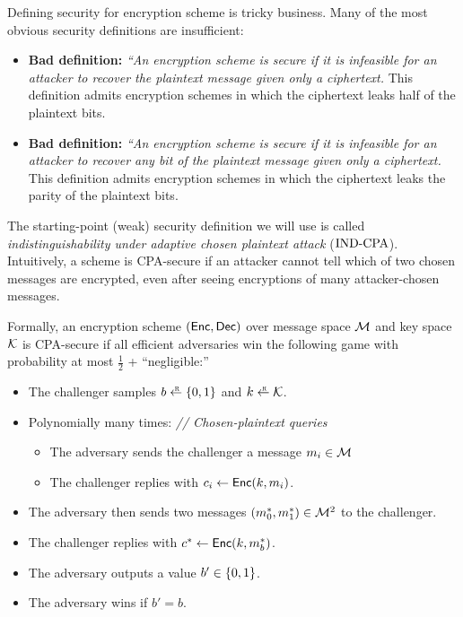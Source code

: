 Defining security for encryption scheme is tricky business.
Many of the most obvious security definitions are insufficient:
\begin{itemize}
  \item \textbf{Bad definition:} \emph{``An encryption scheme is secure 
        if it is infeasible for an attacker to recover the plaintext
        message given only a ciphertext.}
        This definition admits encryption schemes in which the ciphertext
        leaks half of the plaintext bits.
  \item \textbf{Bad definition:} \emph{``An encryption scheme is secure 
        if it is infeasible for an attacker to recover any bit of
        the plaintext message given only a ciphertext.}
        This definition admits encryption schemes in which the ciphertext
        leaks the parity of the plaintext bits.
\end{itemize}

The starting-point (weak) security definition we will use
is called \emph{indistinguishability under adaptive chosen plaintext attack}
($\text{IND-CPA}$).
Intuitively, a scheme is CPA-secure if an attacker cannot tell which of two chosen messages are encrypted, even after seeing encryptions of many attacker-chosen messages.

\begin{definition}\label{defn:cpa}
Formally, an encryption scheme $(\mathsf{Enc}, \mathsf{Dec})$ over message space $\mathcal{M}$
and key space $\mathcal{K}$ is CPA-secure if 
all efficient adversaries win
the following game with probability at most $\tfrac{1}{2}$ + ``negligible:''
  \begin{itemize}[noitemsep]
		\item The challenger samples $b \rgets \bin$ and $k \rgets \calK$.
    \item Polynomially many times: \quad \emph{// Chosen-plaintext queries}
          \begin{itemize}
            \item The adversary sends the challenger a message $m_i \in \mathcal{M}$
            \item The challenger replies with $c_i \gets \mathsf{Enc}(k, m_i)$.
          \end{itemize}
    \item The adversary then sends two messages $(m^*_0, m^*_1) \in \mathcal{M}^2$ to the challenger.
    \item The challenger replies with $c^* \gets \mathsf{Enc}(k, m^*_b)$.
		\item The adversary outputs a value $b' \in \{0,1\}$.
    \item The adversary wins if $b'=b$. 
	\end{itemize}
\end{definition}

